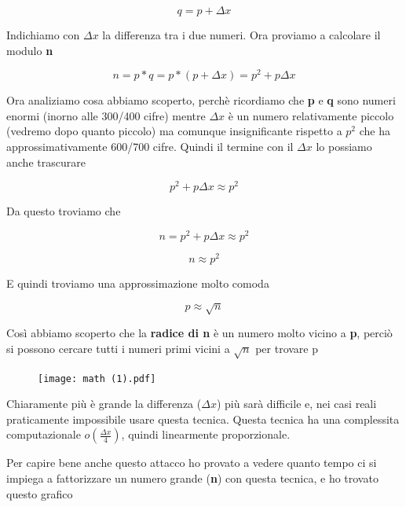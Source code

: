 \documentclass{rapport}
\begin{document}
\begin{equation*}
    q = p + \Delta x
\end{equation*}

Indichiamo con \textbf{$\Delta x$} la differenza tra i due numeri. Ora proviamo a calcolare il modulo \textbf{n}

\begin{equation*}
    n = p *q= p*(p + \Delta x) = p^2 +p\Delta x
\end{equation*}

Ora analiziamo cosa abbiamo scoperto, perchè ricordiamo che \textbf{p} e \textbf{q} sono numeri enormi (inorno alle 300/400 cifre) mentre $\Delta x$ è un numero relativamente piccolo (vedremo dopo quanto piccolo) ma comunque insignificante rispetto a $p^2$ che ha approssimativamente 600/700 cifre. Quindi il termine con il $\Delta x$ lo possiamo anche trascurare

\begin{equation*}
   p^2 +p\Delta x \approx p^2
\end{equation*}

Da questo troviamo che


\begin{equation*}
    n = p^2 +p\Delta x \approx p^2
\end{equation*}

\begin{equation*}
    n \approx p^2
\end{equation*}

E quindi troviamo una approssimazione molto comoda

\begin{equation*}
    p \approx \sqrt{n}
\end{equation*}

Così abbiamo scoperto che la \textbf{radice di n} è un numero molto vicino a \textbf{p}, perciò si possono cercare tutti i numeri primi vicini a $\sqrt{n}$ per trovare p


\begin{figure}[h]
    \centering
    \texttt{[image: math (1).pdf]}
\end{figure}

Chiaramente più è grande la differenza ($\Delta x$) più sarà difficile e, nei casi reali praticamente impossibile usare questa tecnica. Questa tecnica ha una complessita computazionale $o(\frac{\Delta x}{4})$, quindi linearmente proporzionale.

Per capire bene anche questo attacco ho provato a vedere quanto tempo ci si impiega a fattorizzare un numero grande (\textbf{n}) con questa tecnica, e ho trovato questo grafico
\end{document}
